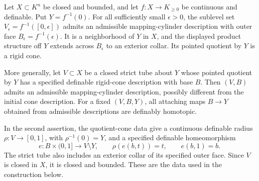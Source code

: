 \begin{theorem}
\label{thm:zero-locus-mapping-cylinder}
Let $X\subset K^n$ be closed and bounded, and let
$f:X\to K_{\ge0}$ be continuous and definable.  Put $Y=f^{-1}(0)$.
For all sufficiently small $\epsilon>0$, the sublevel set
$V_\epsilon=f^{-1}([0,\epsilon])$ admits an admissible
mapping-cylinder description with outer face
$B_\epsilon=f^{-1}(\epsilon)$.  It is a neighborhood of $Y$ in
$X$, and the displayed product structure off $Y$ extends across
$B_\epsilon$ to an exterior collar.  Its pointed quotient by $Y$
is a rigid cone.

More generally, let $V\subset X$ be a closed strict tube about $Y$ whose
pointed quotient by $Y$ has a specified definable rigid-cone
description with base $B$.  Then $(V,B)$ admits an admissible
mapping-cylinder description, possibly different from the initial
cone description.  For a fixed $(V,B,Y)$, all attaching maps
$B\to Y$ obtained from admissible descriptions are definably homotopic.
\end{theorem}
In the second assertion, the quotient-cone data give a continuous
definable radius $\rho:V\to[0,1]$, with $\rho^{-1}(0)=Y$, and a
specified definable homeomorphism
\[
 e:B\times(0,1]\longrightarrow V\setminus Y,
 \qquad \rho(e(b,t))=t,\qquad e(b,1)=b.
\]
The strict tube also includes an exterior collar of its specified
outer face. Since $V$ is closed in $X$, it is closed and bounded.
These are the data used in the construction below.
